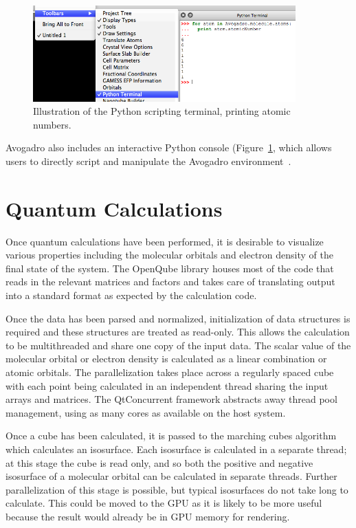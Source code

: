 \documentclass[10pt]{bmc_article}
\newenvironment{bmcformat}{\begin{raggedright}
\baselineskip20pt\sloppy\setboolean{publ}{false}}{\end{raggedright}
\baselineskip20pt\sloppy}
\begin{document}
\begin{bmcformat}
\begin{figure}
  \begin{center}
    \includegraphics[width=0.9\textwidth]{images/python-terminal}
 \end{center}
  \caption{Illustration of the Python scripting terminal, printing
    atomic numbers.}
 \label{f:python-terminal}
\end{figure}

Avogadro also includes an interactive Python console
(Figure~\ref{f:python-terminal}, which allows users to directly script
and manipulate the Avogadro environment~\cite{PythonTerminalTutorial}.


\section{Quantum Calculations} %

Once quantum calculations have been performed, it is desirable
to visualize various properties including the molecular orbitals and electron
density of the final state of the system. The OpenQube library houses most of
the code that reads in the relevant matrices and factors and takes
care of translating output into a
standard format as expected by the calculation code.

Once the data has been parsed and normalized, initialization of data
structures is required and these structures are treated as read-only. This
allows the calculation to be multithreaded and share one copy of the input data.
The scalar value of the molecular orbital or electron density is calculated as a
linear combination or atomic orbitals. The parallelization takes place across a
regularly spaced cube with each point being calculated in an independent thread
sharing the input arrays and matrices. The QtConcurrent framework abstracts away
thread pool management, using as many cores as available on the host system.

Once a cube has been calculated, it is passed to the marching cubes
algorithm which calculates an isosurface. Each isosurface is
calculated in a separate thread; at this stage the cube is read only,
and so both the positive and negative isosurface of a molecular
orbital can be calculated in separate threads. Further parallelization
of this stage is possible, but typical isosurfaces do not take long to
calculate. This could be moved to the GPU as it is likely to be more useful
because the result would already be in GPU memory for rendering.


\end{bmcformat}
\end{document}
